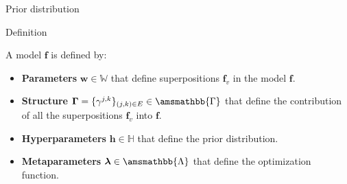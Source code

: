 \documentclass[usenames,dvipsnames,11pt,pdf,utf8,russian,aspectratio=169]{beamer}
\begin{document}
\begin{frame}{Prior distribution}
\begin{block}{Definition}
\end{block}
A model $\mathbf{f}$ is defined by:
\begin{itemize}
\item \textbf{Parameters} $\mathbf{w} \in \mathbb{W}$ that define superpositions  $\mathbf{f}_v$ in the model $\mathbf{f}$.
\item \textbf{Structure} $\boldsymbol{\Gamma}=\{\gamma^{j,k}\}_{(j,k)\in E} \in \amsmathbb{\Gamma}$ that define the contribution of all the superpositions  $\mathbf{f}_v$ into $\mathbf{f}$.
\item \textbf{Hyperparameters} $\mathbf{h} \in \mathbb{H}$ that define the prior distribution.
\item \textbf{Metaparameters} $\boldsymbol{\lambda} \in \amsmathbb{\Lambda}$ that define the optimization function.
\end{itemize}

\end{frame}
\end{document}
